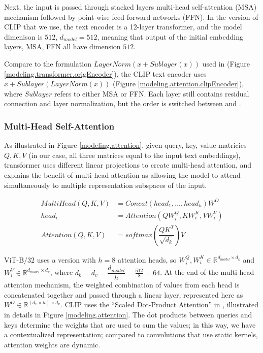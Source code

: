 Next, the input is passed through stacked layers multi-head self-attention (MSA) mechanism followed by point-wise feed-forward networks (FFN). 
In the version of CLIP that we use, the text encoder is a 12-layer transformer, and the model dimenison is $512$, $d_{model} = 512$, meaning that output of the initial embedding layers, MSA, FFN all have dimension $512$.  

Compare to the formulation $LayerNorm(x + Sublayer(x))$ used in \cite{attentionAllYouNeed} (Figure \ref{modeling.transformer.origEncoder}), the CLIP text encoder uses $x + Sublayer(LayerNorm(x))$ (Figure \ref{modeling.attention.clipEncoder}), where $Sublayer$ refers to either MSA or FFN. Each layer still contains residual connection and layer normalization, but the order is switched between \cite{attentionAllYouNeed} and \cite{CLIPpaper}. 

\subsubsection*{Multi-Head Self-Attention}
As illustrated in Figure \ref{modeling.attention}, given query, key, value matricies $Q,K,V$ (in our case, all three matrices equal to the input text embeddings), transformer uses different linear projections to create multi-head attention, and \citet{attentionAllYouNeed} explains the benefit of multi-head attention as allowing the model to attend simultaneously to multiple representation subspaces of the input.      

\begin{equation} \label{mha}
\begin{split}
    MultiHead(Q,K,V) & = Concat({head}_1,\dots,{head}_h)W^O \\
    {head}_i & = Attention(QW_i^{Q}, KW_i^{K}, VW_i^{V}) \\
    Attention(Q,K,V) & = softmax(\dfrac{QK^T}{\sqrt{d_k}})V 
\end{split}
\end{equation}

$\text{ViT-B}/32$ uses a version with $h = 8$ attention heads, so $W_i^{Q}, W_i^{K} \in \mathbb{R}^{d_{model} \times d_k}$ and $W_i^{V} \in \mathbb{R}^{d_{model} \times d_v}$, where $d_k = d_v = \dfrac{d_{model}}{h} = \frac{512}{8} = 64$. 
At the end of the multi-head attention mechanism, the weighted combination of values from each head is concatenated together and passed through a linear layer, represented here as $W^O \in \mathbb{R}^{(d_v \times h) \times d_v}$. 
CLIP uses the ``Scaled Dot-Product Attention'' in \cite{attentionAllYouNeed}, illustrated in details in Figure \ref{modeling.attention}. The dot products between queries and keys determine the weights that are used to sum the values; in this way, we have a contextualized representation; compared to convolutions that use static kernels, attention weights are dynamic.   


